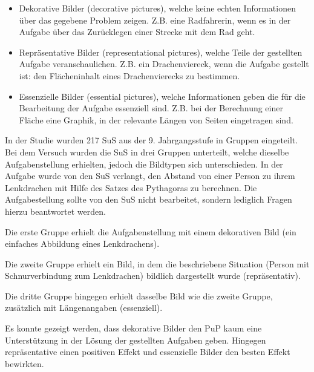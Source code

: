     \begin{itemize}
        \item Dekorative Bilder (decorative pictures), welche keine echten Informationen über das gegebene Problem zeigen. Z.B. eine Radfahrerin, wenn es in der Aufgabe über das Zurücklegen einer Strecke mit dem Rad geht.
        \item Repräsentative Bilder (representational pictures), welche Teile der gestellten Aufgabe veranschaulichen. Z.B. ein Drachenviereck, wenn die Aufgabe gestellt ist: den Flächeninhalt eines Drachenvierecks zu bestimmen. 
        \item Essenzielle Bilder (essential pictures), welche Informationen geben die für die Bearbeitung der Aufgabe essenziell sind. Z.B. bei der Berechnung einer Fläche eine Graphik, in der relevante Längen von Seiten eingetragen sind.
    \end{itemize}

In der Studie wurden 217 \gls{SuS} aus der 9. Jahrgangsstufe in Gruppen eingeteilt. Bei dem Versuch wurden die \gls{SuS} in drei Gruppen unterteilt, welche dieselbe Aufgabenstellung erhielten, jedoch die Bildtypen sich unterschieden. In der Aufgabe wurde von den \gls{SuS} verlangt, den Abstand von einer Person zu ihrem Lenkdrachen mit Hilfe des Satzes des Pythagoras zu berechnen. Die Aufgabestellung sollte von den \gls{SuS} nicht bearbeitet, sondern lediglich Fragen hierzu beantwortet werden. 


Die erste Gruppe erhielt die Aufgabenstellung mit einem dekorativen Bild (ein einfaches Abbildung eines Lenkdrachens).


Die zweite Gruppe erhielt ein Bild, in dem die beschriebene Situation (Person mit Schnurverbindung zum Lenkdrachen) bildlich dargestellt wurde (repräsentativ).


Die dritte Gruppe hingegen erhielt dasselbe Bild wie die zweite Gruppe, zusätzlich mit Längenangaben (essenziell).


Es konnte gezeigt werden, dass dekorative Bilder den \gls{PuP} kaum eine Unterstützung in der Lösung der gestellten Aufgaben geben. Hingegen repräsentative einen positiven Effekt und essenzielle Bilder den besten Effekt bewirkten.

